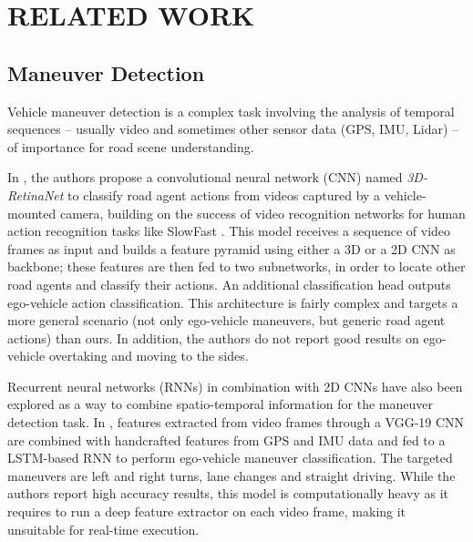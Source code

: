 \section{RELATED WORK}
\label{sec:related-works}

\subsection{Maneuver Detection}
Vehicle maneuver detection is a complex task involving the analysis of temporal sequences -- usually video and sometimes other sensor data (GPS, IMU, Lidar) -- of importance for road scene understanding.

In \cite{singh2023road}, the authors propose a convolutional neural network (CNN) named \emph{3D-RetinaNet} to classify road agent actions from videos captured by a vehicle-mounted camera, building on the success of video recognition networks for human action recognition tasks like SlowFast \cite{Feichtenhofer2019slowfast}. This model receives a sequence of video frames as input and builds a feature pyramid using either a 3D or a 2D CNN as backbone; these features are then fed to two subnetworks, in order to locate other road agents and classify their actions. An additional classification head outputs ego-vehicle action classification. This architecture is fairly complex and targets a more general scenario (not only ego-vehicle maneuvers, but generic road agent actions) than ours. In addition, the authors do not report good results on ego-vehicle overtaking and moving to the sides.

Recurrent neural networks (RNNs) in combination with 2D CNNs have also been explored as a way to combine spatio-temporal information for the maneuver detection task. In \cite{peng2018driving}, features extracted from video frames through a \mbox{VGG-19} CNN are combined with handcrafted features from GPS and IMU data and fed to a LSTM-based RNN to perform ego-vehicle maneuver classification. The targeted maneuvers are left and right turns, lane changes and straight driving. While the authors report high accuracy results, this model is computationally heavy as it requires to run a deep feature extractor on each video frame, making it unsuitable for real-time execution.

